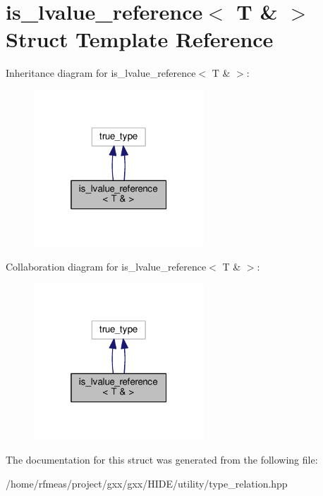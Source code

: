\hypertarget{structis__lvalue__reference_3_01T_01_6_01_4}{}\section{is\+\_\+lvalue\+\_\+reference$<$ T \& $>$ Struct Template Reference}
\label{structis__lvalue__reference_3_01T_01_6_01_4}


Inheritance diagram for is\+\_\+lvalue\+\_\+reference$<$ T \& $>$\+:
\nopagebreak
\begin{figure}[H]
\begin{center}
\leavevmode
\includegraphics[width=181pt]{structis__lvalue__reference_3_01T_01_6_01_4__inherit__graph}
\end{center}
\end{figure}


Collaboration diagram for is\+\_\+lvalue\+\_\+reference$<$ T \& $>$\+:
\nopagebreak
\begin{figure}[H]
\begin{center}
\leavevmode
\includegraphics[width=181pt]{structis__lvalue__reference_3_01T_01_6_01_4__coll__graph}
\end{center}
\end{figure}


The documentation for this struct was generated from the following file\+:\begin{DoxyCompactItemize}
\item 
/home/rfmeas/project/gxx/gxx/\+H\+I\+D\+E/utility/type\+\_\+relation.\+hpp\end{DoxyCompactItemize}
